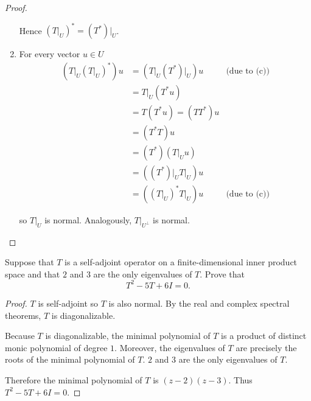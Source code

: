 \begin{proof}
\begin{enumerate}[label={(\alph*)}]
              Hence ${(T\vert_{U})}^{*} = {(T^{*})}\vert_{U}$.
        \item For every vector $u\in U$
              \begin{align*}
                  (T\vert_{U}{(T\vert_{U})}^{*})u & = (T\vert_{U}{(T^{*})}\vert_{U})u & \text{(due to (c))} \\
                                                  & = T\vert_{U}(T^{*}u)                                    \\
                                                  & = T(T^{*}u) = (TT^{*})u                                 \\
                                                  & = (T^{*}T)u                                             \\
                                                  & = (T^{*})(T\vert_{U}u)                                  \\
                                                  & = ({(T^{*})\vert_{U}}T\vert_{U})u                       \\
                                                  & = ({(T\vert_{U})}^{*}T\vert_{U})u & \text{(due to (c))}
              \end{align*}

              so $T\vert_{U}$ is normal. Analogously, $T\vert_{U^{\bot}}$ is normal.
    \end{enumerate}
\end{proof}
\newpage

\begin{exercise}
    Suppose that $T$ is a self-adjoint operator on a finite-dimensional inner product space and that $2$ and $3$ are the only eigenvalues of $T$. Prove that
    \[
        T^{2} - 5T + 6I = 0.
    \]
\end{exercise}

\begin{proof}
    $T$ is self-adjoint so $T$ is also normal. By the real and complex spectral theorems, $T$ is diagonalizable.

    Because $T$ is diagonalizable, the minimal polynomial of $T$ is a product of distinct monic polynomial of degree $1$. Moreover, the eigenvalues of $T$ are precisely the roots of the minimal polynomial of $T$. $2$ and $3$ are the only eigenvalues of $T$.

    Therefore the minimal polynomial of $T$ is $(z - 2)(z - 3)$. Thus $T^{2} - 5T + 6I = 0$.
\end{proof}
\newpage

